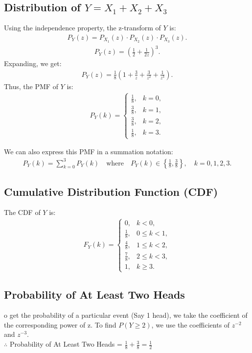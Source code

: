 \documentclass[journal]{IEEEtran}
\begin{document}
\subsection{Distribution of $ Y = X_1 + X_2 + X_3 $}
Using the independence property, the z-transform of $Y$ is:
\begin{align}
P_Y(z) = P_{X_1}(z) \cdot P_{X_2}(z) \cdot P_{X_3}(z).
\end{align}
\begin{align}
P_Y(z) = \left(\frac{1}{2} + \frac{1}{2z}\right)^3.
\end{align}
Expanding, we get:
\begin{align}
P_Y(z) = \frac{1}{8} \left(1 + \frac{3}{z} + \frac{3}{z^2} + \frac{1}{z^3}\right).
\end{align}
Thus, the PMF of $Y$ is:
\begin{align}
P_{Y}(k) =
\begin{cases}
\frac{1}{8}, & k = 0, \\
\frac{3}{8}, & k = 1, \\
\frac{3}{8}, & k = 2, \\
\frac{1}{8}, & k = 3.
\end{cases}
\end{align}

We can also express this PMF in a summation notation:
\begin{align}
P_Y(k) = \sum_{k=0}^{3} P_Y(k) \quad \text{where} \quad P_Y(k) \in \left\{ \frac{1}{8}, \frac{3}{8} \right\}, \quad k = 0, 1, 2, 3.
\end{align}

\subsection{Cumulative Distribution Function (CDF)}
The CDF of $Y$ is:
\begin{align}
F_Y(k) =
\begin{cases}
0, & k < 0, \\
\frac{1}{8}, & 0 \leq k < 1, \\
\frac{4}{8}, & 1 \leq k < 2, \\
\frac{7}{8}, & 2 \leq k < 3, \\
1, & k \geq 3.
\end{cases}
\end{align}

\subsection{Probability of At Least Two Heads}
o get the probability of a particular event (Say 1 head), we take the coefficient of the corresponding power of z.
To find $ P(Y \geq 2) $, we use the coefficients of $z^{-2}$ and $z^{-3}$.\\
$\therefore$ Probability of At Least Two Heads = $\frac{1}{8} + \frac{3}{8} = \frac{1}{2}$
\end{document}
